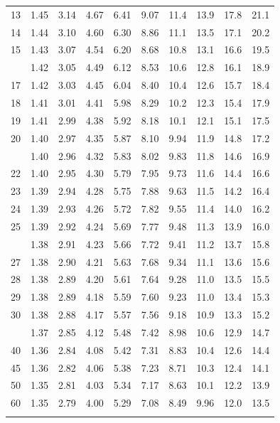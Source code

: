 \documentclass[10pt]{article}
\begin{document}
\begin{longtable}{@{}r!{\vrule width 0.8pt\hspace{0.55em}}rrrrrrrrr@{}}
13 & 1.45 & 3.14 & 4.67 & 6.41 & 9.07 & 11.4 & 13.9 & 17.8 & 21.1 \\
14 & 1.44 & 3.10 & 4.60 & 6.30 & 8.86 & 11.1 & 13.5 & 17.1 & 20.2 \\
15 & 1.43 & 3.07 & 4.54 & 6.20 & 8.68 & 10.8 & 13.1 & 16.6 & 19.5 \\
 & 1.42 & 3.05 & 4.49 & 6.12 & 8.53 & 10.6 & 12.8 & 16.1 & 18.9 \\
17 & 1.42 & 3.03 & 4.45 & 6.04 & 8.40 & 10.4 & 12.6 & 15.7 & 18.4 \\
18 & 1.41 & 3.01 & 4.41 & 5.98 & 8.29 & 10.2 & 12.3 & 15.4 & 17.9 \\
19 & 1.41 & 2.99 & 4.38 & 5.92 & 8.18 & 10.1 & 12.1 & 15.1 & 17.5 \\
20 & 1.40 & 2.97 & 4.35 & 5.87 & 8.10 & 9.94 & 11.9 & 14.8 & 17.2 \\
 & 1.40 & 2.96 & 4.32 & 5.83 & 8.02 & 9.83 & 11.8 & 14.6 & 16.9 \\
22 & 1.40 & 2.95 & 4.30 & 5.79 & 7.95 & 9.73 & 11.6 & 14.4 & 16.6 \\
23 & 1.39 & 2.94 & 4.28 & 5.75 & 7.88 & 9.63 & 11.5 & 14.2 & 16.4 \\
24 & 1.39 & 2.93 & 4.26 & 5.72 & 7.82 & 9.55 & 11.4 & 14.0 & 16.2 \\
25 & 1.39 & 2.92 & 4.24 & 5.69 & 7.77 & 9.48 & 11.3 & 13.9 & 16.0 \\
 & 1.38 & 2.91 & 4.23 & 5.66 & 7.72 & 9.41 & 11.2 & 13.7 & 15.8 \\
27 & 1.38 & 2.90 & 4.21 & 5.63 & 7.68 & 9.34 & 11.1 & 13.6 & 15.6 \\
28 & 1.38 & 2.89 & 4.20 & 5.61 & 7.64 & 9.28 & 11.0 & 13.5 & 15.5 \\
29 & 1.38 & 2.89 & 4.18 & 5.59 & 7.60 & 9.23 & 11.0 & 13.4 & 15.3 \\
30 & 1.38 & 2.88 & 4.17 & 5.57 & 7.56 & 9.18 & 10.9 & 13.3 & 15.2 \\
 & 1.37 & 2.85 & 4.12 & 5.48 & 7.42 & 8.98 & 10.6 & 12.9 & 14.7 \\
40 & 1.36 & 2.84 & 4.08 & 5.42 & 7.31 & 8.83 & 10.4 & 12.6 & 14.4 \\
45 & 1.36 & 2.82 & 4.06 & 5.38 & 7.23 & 8.71 & 10.3 & 12.4 & 14.1 \\
50 & 1.35 & 2.81 & 4.03 & 5.34 & 7.17 & 8.63 & 10.1 & 12.2 & 13.9 \\
60 & 1.35 & 2.79 & 4.00 & 5.29 & 7.08 & 8.49 & 9.96 & 12.0 & 13.5 \\
\addlinespace[0.32em]

\end{longtable}
\end{document}
